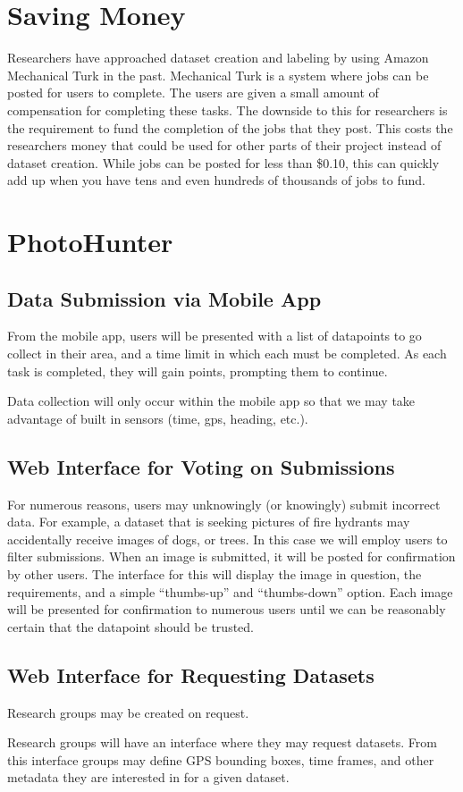 \documentclass{article}
\begin{document}
\section{Saving Money}

Researchers have approached dataset creation and labeling by using 
Amazon Mechanical Turk in the past.  Mechanical Turk is a system where
jobs can be posted for users to complete.  The users are given a small 
amount of compensation for completing these tasks.  The downside to this
for researchers is the requirement to fund the completion of the jobs
that they post.  This costs the researchers money that could be used
for other parts of their project instead of dataset creation.  While jobs
can be posted for less than \$0.10, this can quickly add up when you have
tens and even hundreds of thousands of jobs to fund.

\section{PhotoHunter}

\subsection{Data Submission via Mobile App}

From the mobile app, users will be presented with a list of datapoints
to go collect in their area, and a time limit in which each must be
completed. As each task is completed, they will gain points, prompting
them to continue.

Data collection will only occur within the mobile app so that we may
take advantage of built in sensors (time, gps, heading, etc.).

\subsection{Web Interface for Voting on Submissions}

For numerous reasons, users may unknowingly (or knowingly) submit
incorrect data. For example, a dataset that is seeking pictures of
fire hydrants may accidentally receive images of dogs, or trees. In
this case we will employ users to filter submissions. When an image is
submitted, it will be posted for confirmation by other users. The
interface for this will display the image in question, the
requirements, and a simple ``thumbs-up'' and ``thumbs-down'' option.
Each image will be presented for confirmation to numerous users until
we can be reasonably certain that the datapoint should be trusted.

\subsection{Web Interface for Requesting Datasets}

Research groups may be created on request. 

Research groups will have an interface where they may request
datasets. From this interface groups may define GPS bounding boxes,
time frames, and other metadata they are interested in for a given
dataset.



\end{document}
